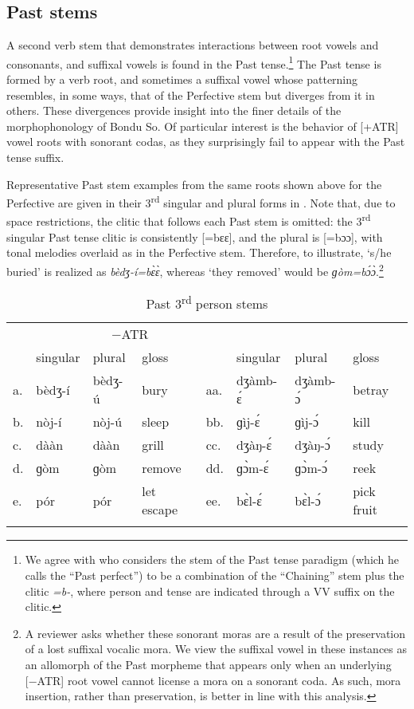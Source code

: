 \documentclass[output=paper,colorlinks,citecolor=brown]{langscibook}
\begin{document}
\subsection{Past stems}
\label{subsec-pst}
A second verb stem that demonstrates interactions between root vowels and consonants, and suffixal vowels is found in the Past tense.\footnote{We agree with \citet[220]{HeathBS2017} who considers the stem of the Past tense paradigm (which he calls the ``Past perfect'') to be a combination of the ``Chaining'' stem plus the clitic \textit{=b-}, where person and tense are indicated through a VV suffix on the clitic.} The Past tense is formed by a verb root, and sometimes a suffixal vowel whose patterning resembles, in some ways, that of the Perfective stem but diverges from it in others. These divergences provide insight into the finer details of the morphophonology of Bondu So. Of particular interest is the behavior of [+ATR] vowel roots with sonorant codas, as they surprisingly fail to appear with the Past tense suffix. 

Representative Past stem examples from the same roots shown above for the Perfective are given in their 3\textsuperscript{rd} singular and plural forms in . Note that, due to space restrictions, the clitic  that follows each Past stem is omitted: the 3\textsuperscript{rd} singular Past tense clitic is consistently [=bɛɛ], and the plural is [=bɔɔ], with tonal melodies overlaid as in the Perfective stem. Therefore, to illustrate, `s/he buried' is realized as \textit{bèdʒ-í=bɛ̀ɛ̀}, whereas `they removed' would be \textit{ɡòm=bɔ́ɔ̀}.\footnote{A reviewer asks whether these sonorant moras are a result of the preservation of a lost suffixal vocalic mora. We view the  suffixal vowel in these instances as an allomorph of the Past morpheme that appears only when an underlying [−ATR] root vowel cannot license a mora on a sonorant coda. As such, mora insertion, rather than preservation, is better in line with this analysis.}

\begin{table}
\caption{Past 3\textsuperscript{rd} person stems}
\label{tab:pst}
\begin{tabular}{ *2{l@{~~}lll} } 
    \lsptoprule
    \multicolumn{4}{c}{+ATR}&\multicolumn{4}{c}{−ATR}\\\cmidrule(lr){1-4}\cmidrule(lr){5-8}
    & singular & plural & gloss & & singular & plural & gloss \\
    \midrule
    a. 	&	bèdʒ-í	& bèdʒ-ú &	bury	&	aa.	& dʒàmb-ɛ́	& dʒàmb-ɔ́  &	betray	\\
    b.	&	nòj-í	&	nòj-ú	&	sleep	&	bb.	&	ɡìj-ɛ́	&	ɡìj-ɔ́	&	kill	\\\addlinespace
    c.	&	dààn	&	dààn	&	grill	&	cc.	&	dʒàŋ-ɛ́	&	dʒàŋ-ɔ́	&	study	\\
    d.	&	ɡòm	&	ɡòm	&	remove	&	dd.	&	ɡɔ̀m-ɛ́	&	ɡɔ̀m-ɔ́	&	reek	\\
    e.	&	pór	&	pór	&	let escape	&	ee.	&	bɛ̀l-ɛ́	&	bɛ̀l-ɔ́	&	pick fruit	\\
    \lspbottomrule
\end{tabular}
\end{table}
\end{document}
